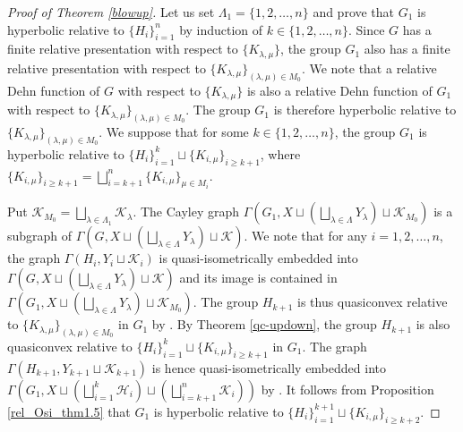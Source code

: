 \documentclass{amsart}
\theoremstyle{definition}
\begin{document}
\begin{proof}[Proof of Theorem \ref{blowup}]
Let us set $\Lambda_1=\{1,2,\ldots, n\}$ and prove that $G_1$ is hyperbolic relative to $\{H_{i}\}_{i=1}^{n}$ by induction of $k\in\{1,2,\ldots, n\}$. 
Since $G$ has a finite relative presentation with respect to $\{K_{\lambda,\mu}\}$, the group $G_1$ also has a finite relative presentation with respect to $\{K_{\lambda,\mu}\}_{(\lambda,\mu)\in M_0}$. 
We note that  a relative Dehn function of $G$ with respect to $\{K_{\lambda,\mu}\}$ is also a relative Dehn function of $G_1$ with respect to $\{K_{\lambda,\mu}\}_{(\lambda,\mu)\in M_0}$. 
The group $G_1$ is therefore hyperbolic relative to $\{K_{\lambda,\mu}\}_{(\lambda,\mu)\in M_0}$. 
We suppose that for some $k \in \{1,2,\ldots,n\}$, the group $G_1$ is hyperbolic relative to $\{H_i\}_{i=1}^k\sqcup \{K_{i,\mu}\}_{i\geq k+1}$, where $\{K_{i,\mu}\}_{i\geq k+1}=\bigsqcup_{i=k+1}^n\{K_{i,\mu}\}_{\mu\in M_i}$. 

Put ${\mathcal K}_{M_0}=\bigsqcup_{\lambda\in\Lambda_1}{\mathcal K}_\lambda$. 
The Cayley graph $\Gamma(G_1,X\sqcup \left(\bigsqcup_{\lambda\in\Lambda}Y_\lambda\right)\sqcup{\mathcal K}_{M_0})$ is a subgraph of $\Gamma(G,X\sqcup\left(\bigsqcup_{\lambda\in\Lambda}Y_\lambda\right)\sqcup{\mathcal K})$. 
We note that for any $i = 1,2,\ldots, n$, the graph $\Gamma(H_i, Y_i\sqcup {\mathcal K}_i)$ is quasi-isometrically embedded into $\Gamma(G,X\sqcup\left(\bigsqcup_{\lambda\in\Lambda}Y_\lambda\right)\sqcup{\mathcal K})$ and its image is contained in $\Gamma(G_1,X\sqcup \left(\bigsqcup_{\lambda\in\Lambda}Y_\lambda\right)\sqcup{\mathcal K}_{M_0})$. 
The group $H_{k+1}$ is thus quasiconvex relative to $\{K_{\lambda,\mu}\}_{(\lambda,\mu)\in M_0}$ in $G_1$ by \cite[Theorem 1.4 (i)]{M-O-Y1}. 
By Theorem \ref{qc-updown}, the group $H_{k+1}$ is also quasiconvex relative to $ \{H_i\}_{i=1}^k\sqcup \{K_{i,\mu}\}_{i\geq k+1}$ in $G_1$. 
The graph $\Gamma(H_{k+1},Y_{k+1}\sqcup {\mathcal K}_{k+1})$ is hence quasi-isometrically embedded into $\Gamma\left(G_1,X\sqcup\left(\bigsqcup_{i=1}^k {\mathcal H}_i \right)\sqcup \left(\bigsqcup_{i=k+1}^{n} {\mathcal K}_i \right)\right)$ by \cite[Theorem 1.4 (i)]{M-O-Y1}. 
It follows from Proposition \ref{rel_Osi_thm1.5} that $G_1$ is hyperbolic relative to $ \{H_i\}_{i=1}^{k+1}\sqcup \{K_{i,\mu}\}_{i\geq k+2}$. 
\end{proof}
\end{document}
